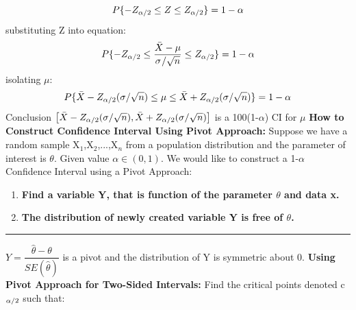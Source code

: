 \documentclass[]{article}
\begin{document}
\[  P \{ -Z_{\alpha\\/2} \le Z \le Z_{\alpha\\/2}  \}  = 1 - \alpha  \] 
\newline substituting Z into equation:
\[  P \{ -Z_{\alpha\\/2} \le \dfrac{\bar{X} - \mu}{\sigma \\/ \sqrt{n} }  \le Z_{\alpha\\/2}  \}  = 1 - \alpha  \] 
\newline isolating $\mu$:
\[  P \{ \bar{X}-Z_{\alpha\\/2} (\sigma \\/ \sqrt{n}) \le \mu \le \bar{X}+Z_{\alpha\\/2} (\sigma \\/ \sqrt{n})  \}   = 1 - \alpha  \] 
\newline Conclusion
$\left[\bar{X} - Z_{\alpha\\/2} (\sigma \\/ \sqrt{n}), \bar{X} + Z_{\alpha\\/2} (\sigma \\/ \sqrt{n}) \right] $ is a 100(1-$\alpha$) CI for $\mu$ 
\newline
\newline\textbf{How to Construct Confidence Interval Using Pivot Approach:} 
\newline Suppose we have a random sample X$_1$,X$_2$,...,X$_n$ from a population distribution and the parameter of interest is $\theta$.
\newline
\newline Given value $\alpha \in (0,1)$. We would like to construct a 1-$\alpha$ Confidence Interval using a Pivot Approach:
\begin{enumerate}
	\item\textbf{Find a variable Y, that is function of the parameter $\theta$ and data x.}
	\item\textbf{The distribution of newly created variable Y is free of $\theta$.}
\end{enumerate}
\newline\Large\rule{3.0cm}{0pt}$Y = \dfrac{\hat{\theta} - \theta}{ SE(\hat{\theta})}$ is a pivot and the distribution of Y is symmetric about 0.
\newline
\newline
\newline\Large\textbf{ Using Pivot Approach for Two-Sided Intervals:}
\newline Find the critical points denoted c$_{\alpha \\/ 2}$ such that:
\end{document}

